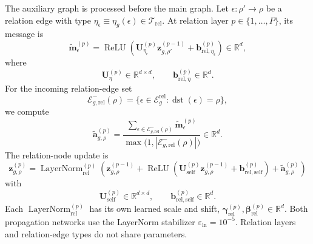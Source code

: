 \documentclass[11pt]{article}
\newcommand{\R}{\mathbb{R}}
\newcommand{\rel}{\mathrm{rel}}
\DeclareMathOperator{\ReLU}{ReLU}
\DeclareMathOperator{\LayerNorm}{LayerNorm}
\DeclareMathOperator{\dst}{dst}
\begin{document}
The auxiliary graph is processed before the main graph.  Let
\(\epsilon:\rho'\to\rho\) be a relation edge with type
\(\eta_\epsilon\equiv\eta_g(\epsilon)\in\mathcal T_{\rel}\).  At relation
layer \(p\in\{1,\ldots,P\}\), its message is
\begin{equation}
    \widetilde{\mathbf m}_{\epsilon}^{(p)}
    =
    \ReLU
    \left(
        \mathbf U_{\eta_\epsilon}^{(p)}
        \mathbf z_{g,\rho'}^{(p-1)}
        +
        \mathbf b_{\rel,\eta_\epsilon}^{(p)}
    \right)
    \in\R^d,
    \label{eq:relation-message}
\end{equation}
where
\begin{equation}
    \mathbf U_{\eta}^{(p)}\in\R^{d\times d},
    \qquad
    \mathbf b_{\rel,\eta}^{(p)}\in\R^d.
    \label{eq:relation-edge-parameter-domains}
\end{equation}
For the incoming relation-edge set
\begin{equation}
    \mathcal E_{g,\rel}^{-}(\rho)
    =
    \{\epsilon\in\mathcal E_g^{\rel}:\dst(\epsilon)=\rho\},
    \label{eq:relation-incoming-edges}
\end{equation}
we compute
\begin{equation}
    \widetilde{\mathbf a}_{g,\rho}^{(p)}
    =
    \frac{
        \displaystyle
        \sum_{\epsilon\in\mathcal E_{g,\rel}^{-}(\rho)}
        \widetilde{\mathbf m}_{\epsilon}^{(p)}
    }{
        \displaystyle
        \max\bigl(1,|\mathcal E_{g,\rel}^{-}(\rho)|\bigr)
    }
    \in\R^d.
    \label{eq:relation-aggregation}
\end{equation}
The relation-node update is
\begin{equation}
    \boxed{
    \mathbf z_{g,\rho}^{(p)}
    =
    \LayerNorm_{\rel}^{(p)}
    \left(
        \mathbf z_{g,\rho}^{(p-1)}
        +
        \ReLU
        \left(
            \mathbf U_{\mathrm{self}}^{(p)}
            \mathbf z_{g,\rho}^{(p-1)}
            +
            \mathbf b_{\rel,\mathrm{self}}^{(p)}
        \right)
        +
        \widetilde{\mathbf a}_{g,\rho}^{(p)}
    \right)
    }
    \label{eq:relation-update}
\end{equation}
with
\begin{equation}
    \mathbf U_{\mathrm{self}}^{(p)}\in\R^{d\times d},
    \qquad
    \mathbf b_{\rel,\mathrm{self}}^{(p)}\in\R^d.
    \label{eq:relation-self-domains}
\end{equation}
Each \(\LayerNorm_{\rel}^{(p)}\) has its own learned scale and shift,
\(\boldsymbol\gamma_{\rel}^{(p)},\boldsymbol\beta_{\rel}^{(p)}\in\R^d\).
Both propagation networks use the LayerNorm stabilizer
\(\varepsilon_{\mathrm{ln}}=10^{-5}\).  Relation layers and relation-edge
types do not share parameters.
\end{document}
